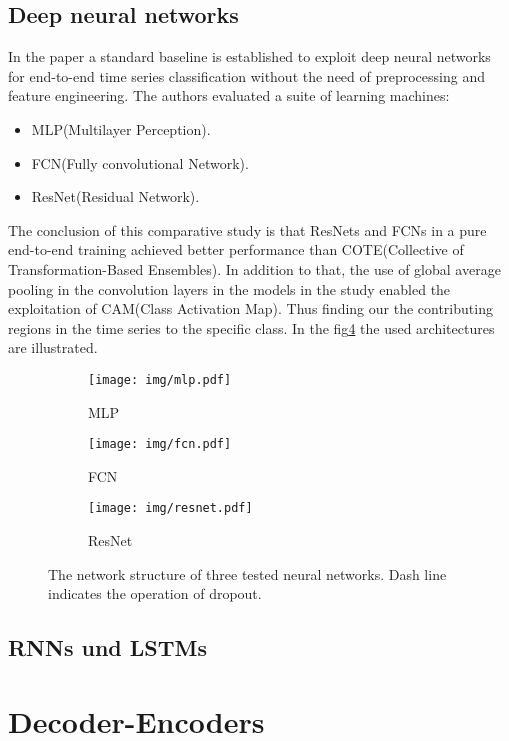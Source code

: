 \subsection{Deep neural networks}
In the paper \cite{yang2019time} a standard baseline is established to exploit deep neural networks for end-to-end time series classification without the need of preprocessing and feature engineering. The authors evaluated a suite of learning machines:
\begin{itemize}
	\item MLP(Multilayer Perception).
	\item FCN(Fully convolutional Network).
	\item ResNet(Residual Network).
\end{itemize}
The conclusion of this comparative study is that ResNets and FCNs in a pure end-to-end training achieved better performance than COTE(Collective of Transformation-Based Ensembles)\cite{2015TSClassificationCOTE}. In addition to that, the use of global average pooling in the convolution layers in the models in the study enabled the exploitation of CAM(Class Activation Map). Thus finding our the contributing regions in the time series to the specific class\cite{wang2017time}. In the fig\ref{fig:wang2017time} the used architectures are illustrated.
\begin{figure}
	\centering
	\begin{subfigure}[b]{0.25\textwidth}
		\centering
		\texttt{[image: img/mlp.pdf]}
		\caption{MLP}
		\label{fig:wang2017timemlp}
	\end{subfigure}
	\hfill
	\begin{subfigure}[b]{0.25\textwidth}
		\centering
		\texttt{[image: img/fcn.pdf]}
		\caption{FCN}
		\label{fig:wang2017timefcn}
	\end{subfigure}
	\hfill
	\begin{subfigure}[b]{0.3\textwidth}
		\centering
		\texttt{[image: img/resnet.pdf]}
		\caption{ResNet}
		\label{fig:wang2017timeresnet}
	\end{subfigure}
	\caption{The network structure of three tested neural networks. Dash line indicates the operation of dropout\cite{wang2017time}.}
	\label{fig:wang2017time}
\end{figure}
\subsection{RNNs und LSTMs}
\section{Decoder-Encoders}
